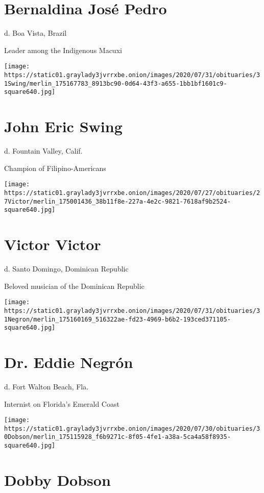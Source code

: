 \hypertarget{bernaldina-josuxe9-pedro}{%
\section{Bernaldina José Pedro}\label{bernaldina-josuxe9-pedro}}

d. Boa Vista, Brazil

Leader among the Indigenous Macuxi

\texttt{[image: https://static01.graylady3jvrrxbe.onion/images/2020/07/31/obituaries/31Swing/merlin\_175167783\_8913bc90-0d64-43f3-a655-1bb1bf1601c9-square640.jpg]}

\hypertarget{john-eric-swing}{%
\section{John Eric Swing}\label{john-eric-swing}}

d. Fountain Valley, Calif.

Champion of Filipino-Americans

\texttt{[image: https://static01.graylady3jvrrxbe.onion/images/2020/07/27/obituaries/27Victor/merlin\_175001436\_38b11f8e-227a-4e2c-9821-7618af9b2524-square640.jpg]}

\hypertarget{victor-victor}{%
\section{Victor Victor}\label{victor-victor}}

d. Santo Domingo, Dominican Republic

Beloved musician of the Dominican Republic

\texttt{[image: https://static01.graylady3jvrrxbe.onion/images/2020/07/31/obituaries/31Negron/merlin\_175160169\_516322ae-fd23-4969-b6b2-193ced371105-square640.jpg]}

\hypertarget{dr-eddie-negruxf3n}{%
\section{Dr. Eddie Negrón}\label{dr-eddie-negruxf3n}}

d. Fort Walton Beach, Fla.

Internist on Florida's Emerald Coast

\texttt{[image: https://static01.graylady3jvrrxbe.onion/images/2020/07/30/obituaries/30Dobson/merlin\_175115928\_f6b9271c-8f05-4fe1-a38a-5ca4a58f8935-square640.jpg]}

\hypertarget{dobby-dobson}{%
\section{Dobby Dobson}\label{dobby-dobson}}


